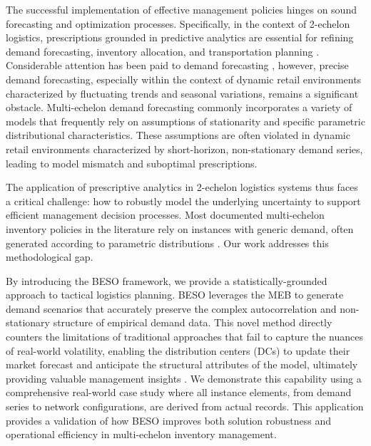 \documentclass{itor}
\begin{document}
The successful implementation of effective management policies hinges on sound forecasting and optimization processes. Specifically, in the context of 2-echelon logistics, prescriptions grounded in predictive analytics are essential for refining demand forecasting, inventory allocation, and transportation planning \citep{A01,KK10}. Considerable attention has been paid to demand forecasting \citep{Ma15,Shenstone01}, however, precise demand forecasting, especially within the context of dynamic retail environments characterized by fluctuating trends and seasonal variations, remains a significant obstacle. Multi-echelon demand forecasting commonly incorporates a variety of models that frequently rely on assumptions of stationarity and specific parametric distributional characteristics. These assumptions are often violated in dynamic retail environments characterized by short-horizon, non-stationary demand series, leading to model mismatch and suboptimal prescriptions.

The application of prescriptive analytics in 2-echelon logistics systems thus faces a critical challenge: how to robustly model the underlying uncertainty to support efficient management decision processes. Most documented multi-echelon inventory policies in the literature rely on instances with generic demand, often generated according to parametric distributions \citep{Escorcia20,EG81}. Our work addresses this methodological gap.

By introducing the BESO framework, we provide a statistically-grounded approach to tactical logistics planning. BESO leverages the MEB to generate demand scenarios that accurately preserve the complex autocorrelation and non-stationary structure of empirical demand data. This novel method directly counters the limitations of traditional approaches that fail to capture the nuances of real-world volatility, enabling the distribution centers (DCs) to update their market forecast and anticipate the structural attributes of the model, ultimately providing valuable management insights \citep{P16}. We demonstrate this capability using a comprehensive real-world case study where all instance elements, from demand series to network configurations, are derived from actual records. This application provides a validation of how BESO improves both solution robustness and operational efficiency in multi-echelon inventory management.

\end{document}

